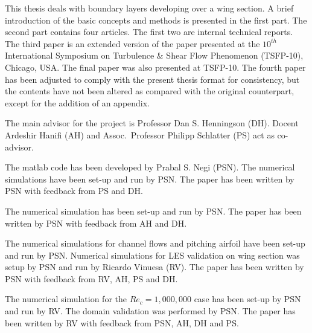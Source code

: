 %
\begin{preface}
	This thesis deals with boundary layers developing over a wing section. A brief introduction of the basic concepts and methods is presented in the first part. The second part contains four articles. The first two are internal technical reports. The third paper is an extended version of the paper presented at the $10^{th}$ International Symposium on Turbulence \& Shear Flow Phenomenon (TSFP-10), Chicago, USA. The final paper was also presented at TSFP-10. The fourth paper has been adjusted to comply with the present thesis format for consistency, but the contents have not been altered as compared with the original counterpart, except for the addition of an appendix.
\end{preface}


%
\begin{divisionofwork}
	The main advisor for the project is Professor Dan S. Henningson (DH).
	Docent Ardeshir Hanifi (AH) and Assoc.\ Professor Philipp Schlatter (PS) act as co-advisor.

	\paperitem
		The matlab code has been developed by Prabal S. Negi (PSN). The numerical simulations have been set-up and run by PSN. The paper has been written by PSN with feedback from PS and DH. 

	\paperitem
		The numerical simulation has been set-up and run by PSN. The paper has been written by PSN with feedback from AH and DH. 

	\paperitem
		The numerical simulations for channel flows and pitching airfoil have been set-up and run by PSN. Numerical simulations for LES validation on wing section was setup by PSN and run by Ricardo Vinuesa (RV). The paper has been written by PSN with feedback from RV, AH, PS and DH. 

	\paperitem
		The numerical simulation for the $Re_{c}=1,000,000$ case has been set-up by PSN and run by RV. The domain validation was performed by PSN. The paper has been written by RV with feedback from PSN, AH, DH and PS.

\end{divisionofwork}


%
%


